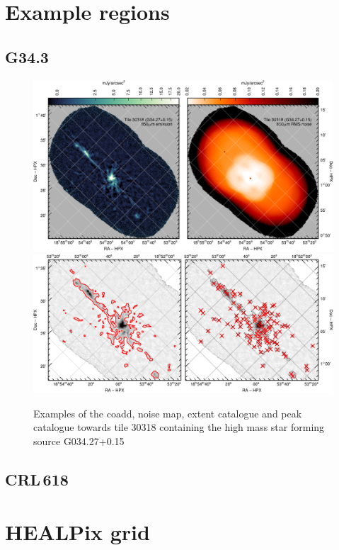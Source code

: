 \documentclass[twocolumn]{aastex6}
\begin{document}
\section{Example regions}
\subsection{G34.3}
\begin{figure}
  \centering
  \includegraphics{tile30318-g34-coadd-noise.pdf}
  \\[3mm]
  \includegraphics{tile30318-g34-extent-peak.pdf}
  \caption{Examples of the coadd, noise map, extent catalogue and peak
    catalogue towards tile 30318 containing the high mass star forming
    source G034.27+0.15}
  \label{fig:g34-3}
\end{figure}
\subsection{CRL\,618}


\section{HEALPix grid}
\end{document}

